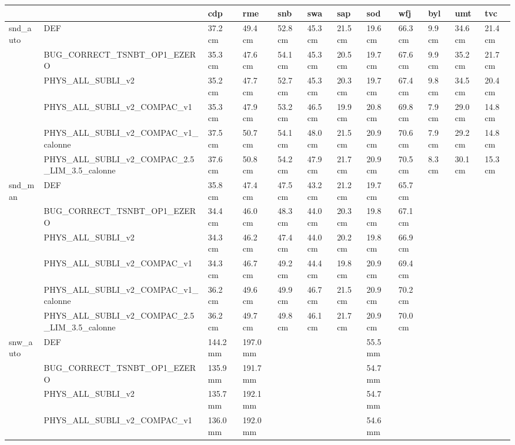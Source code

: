 \begin{tabular}{llllllllllll}
\toprule
 &  & cdp & rme & snb & swa & sap & sod & wfj & byl & umt & tvc \\
\midrule
\multirow[t]{6}{*}{snd_auto} & DEF & 37.2 cm & 49.4 cm & 52.8 cm & 45.3 cm & 21.5 cm & 19.6 cm & 66.3 cm & 9.9 cm & 34.6 cm & 21.4 cm \\
 & BUG_CORRECT_TSNBT_OP1_EZERO & 35.3 cm & 47.6 cm & 54.1 cm & 45.3 cm & 20.5 cm & 19.7 cm & 67.6 cm & 9.9 cm & 35.2 cm & 21.7 cm \\
 & PHYS_ALL_SUBLI_v2 & 35.2 cm & 47.7 cm & 52.7 cm & 45.3 cm & 20.3 cm & 19.7 cm & 67.4 cm & 9.8 cm & 34.5 cm & 20.4 cm \\
 & PHYS_ALL_SUBLI_v2_COMPAC_v1 & 35.3 cm & 47.9 cm & 53.2 cm & 46.5 cm & 19.9 cm & 20.8 cm & 69.8 cm & 7.9 cm & 29.0 cm & 14.8 cm \\
 & PHYS_ALL_SUBLI_v2_COMPAC_v1_calonne & 37.5 cm & 50.7 cm & 54.1 cm & 48.0 cm & 21.5 cm & 20.9 cm & 70.6 cm & 7.9 cm & 29.2 cm & 14.8 cm \\
 & PHYS_ALL_SUBLI_v2_COMPAC_2.5_LIM_3.5_calonne & 37.6 cm & 50.8 cm & 54.2 cm & 47.9 cm & 21.7 cm & 20.9 cm & 70.5 cm & 8.3 cm & 30.1 cm & 15.3 cm \\
\cline{1-12}
\multirow[t]{6}{*}{snd_man} & DEF & 35.8 cm & 47.4 cm & 47.5 cm & 43.2 cm & 21.2 cm & 19.7 cm & 65.7 cm &  &  &  \\
 & BUG_CORRECT_TSNBT_OP1_EZERO & 34.4 cm & 46.0 cm & 48.3 cm & 44.0 cm & 20.3 cm & 19.8 cm & 67.1 cm &  &  &  \\
 & PHYS_ALL_SUBLI_v2 & 34.3 cm & 46.2 cm & 47.4 cm & 44.0 cm & 20.2 cm & 19.8 cm & 66.9 cm &  &  &  \\
 & PHYS_ALL_SUBLI_v2_COMPAC_v1 & 34.3 cm & 46.7 cm & 49.2 cm & 44.4 cm & 19.8 cm & 20.9 cm & 69.4 cm &  &  &  \\
 & PHYS_ALL_SUBLI_v2_COMPAC_v1_calonne & 36.2 cm & 49.6 cm & 49.9 cm & 46.7 cm & 21.5 cm & 20.9 cm & 70.2 cm &  &  &  \\
 & PHYS_ALL_SUBLI_v2_COMPAC_2.5_LIM_3.5_calonne & 36.2 cm & 49.7 cm & 49.8 cm & 46.1 cm & 21.7 cm & 20.9 cm & 70.0 cm &  &  &  \\
\cline{1-12}
\multirow[t]{6}{*}{snw_auto} & DEF & 144.2 mm & 197.0 mm &  &  &  & 55.5 mm &  &  &  &  \\
 & BUG_CORRECT_TSNBT_OP1_EZERO & 135.9 mm & 191.7 mm &  &  &  & 54.7 mm &  &  &  &  \\
 & PHYS_ALL_SUBLI_v2 & 135.7 mm & 192.1 mm &  &  &  & 54.7 mm &  &  &  &  \\
 & PHYS_ALL_SUBLI_v2_COMPAC_v1 & 136.0 mm & 192.0 mm &  &  &  & 54.6 mm &  &  &  &  \\

\end{tabular}
